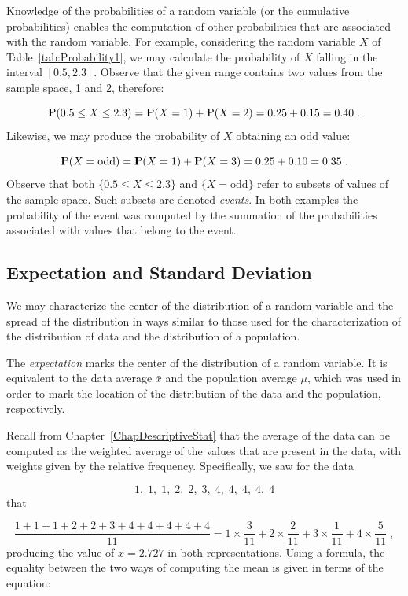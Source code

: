 \documentclass[]{krantz}
\newcommand{\Prob}{{\rm I\kern-.3em P}}
\theoremstyle{definition}
\theoremstyle{definition}
\theoremstyle{definition}
\theoremstyle{remark}
\begin{document}
Knowledge of the probabilities of a random variable (or the cumulative
probabilities) enables the computation of other probabilities that are
associated with the random variable. For example, considering the random
variable \(X\) of Table~\ref{tab:Probability1}, we may calculate the
probability of \(X\) falling in the interval \([0.5, 2.3]\). Observe
that the given range contains two values from the sample space, 1 and 2,
therefore:

\[\Prob(0.5 \leq X \leq 2.3) = \Prob(X=1) + \Prob(X = 2) = 0.25 + 0.15 = 0.40\;.\]
Likewise, we may produce the probability of \(X\) obtaining an odd
value:

\[\Prob(X = \mbox{odd}) = \Prob(X=1) + \Prob(X=3) = 0.25 + 0.10 = 0.35\;.\]
Observe that both \(\{0.5 \leq X \leq 2.3\}\) and \(\{X = \mbox{odd}\}\)
refer to subsets of values of the sample space. Such subsets are denoted
\emph{events}. In both examples the probability of the event was
computed by the summation of the probabilities associated with values
that belong to the event.

\subsection{Expectation and Standard
Deviation}\label{expectation-and-standard-deviation}

We may characterize the center of the distribution of a random variable
and the spread of the distribution in ways similar to those used for the
characterization of the distribution of data and the distribution of a
population.

The \emph{expectation} marks the center of the distribution of a random
variable. It is equivalent to the data average \(\bar x\) and the
population average \(\mu\), which was used in order to mark the location
of the distribution of the data and the population, respectively.

Recall from Chapter~\ref{ChapDescriptiveStat} that the average of the
data can be computed as the weighted average of the values that are
present in the data, with weights given by the relative frequency.
Specifically, we saw for the data

\[1,\; 1,\; 1,\; 2,\; 2,\; 3,\; 4,\; 4,\; 4,\; 4,\; 4\] that

\[\frac{1 + 1 + 1 + 2 + 2 + 3 + 4 + 4 + 4 + 4 + 4}{11} =
1\times \frac{3}{11} + 2 \times \frac{2}{11} + 3 \times \frac{1}{11} + 4 \times \frac{5}{11}\;,\]
producing the value of \(\bar x =2.727\) in both representations. Using
a formula, the equality between the two ways of computing the mean is
given in terms of the equation:
\end{document}
